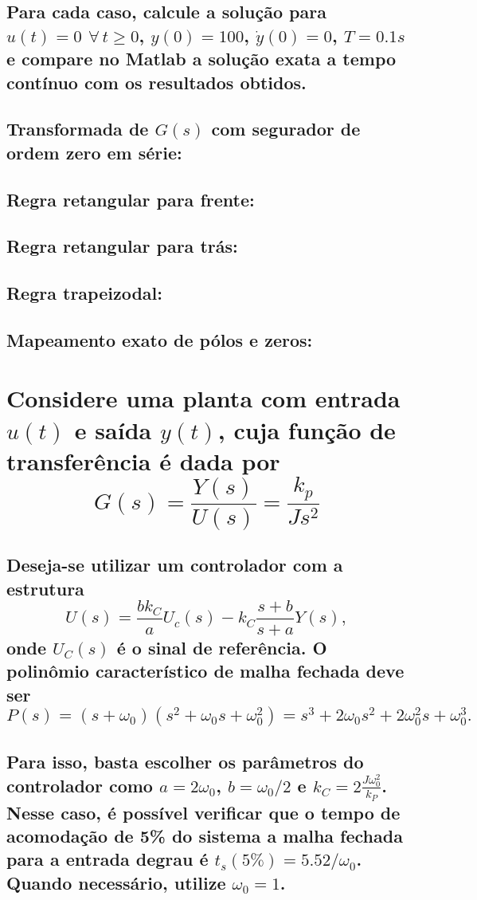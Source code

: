\documentclass{article}
\begin{document}
\subsection*{Para cada caso, calcule a solução para $u(t) = 0$ $\forall\, t \geq 0$, $y(0) = 100$, $\dot{y}(0) = 0$, $T = 0.1s$ e compare no Matlab a solução exata a tempo contínuo com os resultados obtidos.}

\subsection{Transformada de $ G(s) $ com segurador de ordem zero em série:}


\subsection{Regra retangular para frente:}


\subsection{Regra retangular para trás:}


\subsection{Regra trapeizodal:}


\subsection{Mapeamento exato de pólos e zeros:}


\vspace{5cm}
\section{Considere uma planta com entrada $u(t)$ e saída $y(t)$, cuja função de transferência é dada por $$ G(s) = \frac{Y(s)}{U(s)} = \frac{k_p}{Js^2} $$}
\subsection*{Deseja-se utilizar um controlador com a estrutura $$ U(s) = \frac{bk_C}{a}U_c(s) - k_C\frac{s+b}{s+a}Y(s), $$ onde $U_C(s)$ é o sinal de referência. O polinômio característico de malha fechada deve ser $$ P(s) = (s+\omega_0)(s^2 + \omega_0s + \omega_0^2) = s^3 + 2\omega_0s^2 + 2\omega_0^2s + \omega_0^3. $$}
\subsection*{Para isso, basta escolher os parâmetros do controlador como $a = 2\omega_0$, $b = \omega_0/2$ e $k_C = 2\frac{J\omega_0^2}{k_P}$. Nesse caso, é possível verificar que o tempo de acomodação de 5\% do sistema a malha fechada para a entrada degrau é $t_s(5\%) = 5.52/\omega_0$. Quando necessário, utilize $\omega_0 = 1$.}
\end{document}
